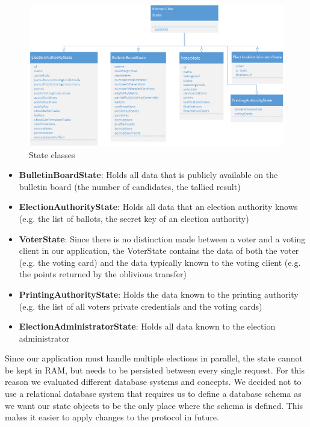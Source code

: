 \begin{figure}[h!]
\begin{center}
\includegraphics[scale=0.75]{assets/stateClasses.png}
\caption{State classes}
\end{center}
\end{figure}

\begin{itemize}
	\item \textbf{BulletinBoardState}: Holds all data that is publicly available on the bulletin board (the number of candidates, the tallied result)
	\item \textbf{ElectionAuthorityState}: Holds all data that an election authority knows (e.g. the list of ballots, the secret key of an election authority)
	\item \textbf{VoterState}: Since there is no distinction made between a voter and a voting client in our application, the VoterState contains the data of both the voter (e.g. the voting card) and the data typically known to the voting client (e.g. the points returned by the oblivious transfer)
	\item \textbf{PrintingAuthorityState}: Holds the data known to the printing authority (e.g. the list of all voters private credentials and the voting cards)
	\item \textbf{ElectionAdministratorState}: Holds all data known to the election administrator 
\end{itemize}

Since our application must handle multiple elections in parallel, the state cannot be kept in RAM, but needs to be persisted between every single request. For this reason we evaluated different database systems and concepts. We decided not to use a relational database system that requires us to define a database schema as we want our state objects to be the only place where the schema is defined. This makes it easier to apply changes to the protocol in future. 

